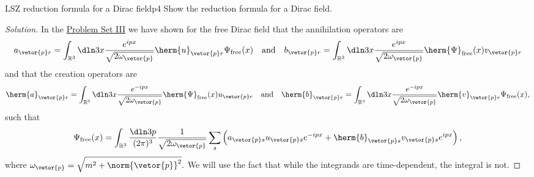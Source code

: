 \begin{problem}{LSZ reduction formula for a Dirac field}{p4}
   Show the reduction formula for a Dirac field.
\end{problem}
\begin{proof}[Solution]
   In the \href{https://github.com/louisradial/4305107-quantum-field-theory-i/releases/tag/pset3}{Problem Set III} we have shown for the free Dirac field that the annihilation operators are
   \begin{equation*}
      a_{\vetor{p} r} = \int_{\mathbb{R}^3} \dln3x \frac{e^{ipx}}{\sqrt{2 \omega_{\vetor{p}}}} \herm{u}_{\vetor{p} r} \Psi_{\mathrm{free}}(x)
      \quad\text{and}\quad
      b_{\vetor{p} r} = \int_{\mathbb{R}^3} \dln3x \frac{e^{ipx}}{\sqrt{2 \omega_{\vetor{p}}}} \herm{\Psi}_{\mathrm{free}}(x) v_{\vetor{p} r}
   \end{equation*}
   and that the creation operators are
   \begin{equation*}
      \herm{a}_{\vetor{p} r} = \int_{\mathbb{R}^3} \dln3x \frac{e^{-ipx}}{\sqrt{2 \omega_{\vetor{p}}}} \herm{\Psi}_{\mathrm{free}}(x) u_{\vetor{p} r} 
      \quad\text{and}\quad
      \herm{b}_{\vetor{p} r} = \int_{\mathbb{R}^3} \dln3x \frac{e^{-ipx}}{\sqrt{2 \omega_{\vetor{p}}}} \herm{v}_{\vetor{p} r} \Psi_{\mathrm{free}}(x),
   \end{equation*}
   such that
   \begin{equation*}
      \Psi_{\mathrm{free}}(x) = \int_{\mathbb{R}^3} \frac{\dln3p}{(2\pi)^3} \frac{1}{\sqrt{2\omega_{\vetor{p}}}} \sum_{s} \left(a_{\vetor{p} s} u_{\vetor{p} s} e^{-ipx} + \herm{b}_{\vetor{p} s} v_{\vetor{p} s} e^{ipx}\right),
   \end{equation*}
   where \(\omega_{\vetor{p}} = \sqrt{m^2 + \norm{\vetor{p}}^2}.\) We will use the fact that while the integrands are time-dependent, the integral is not.


\end{proof}
